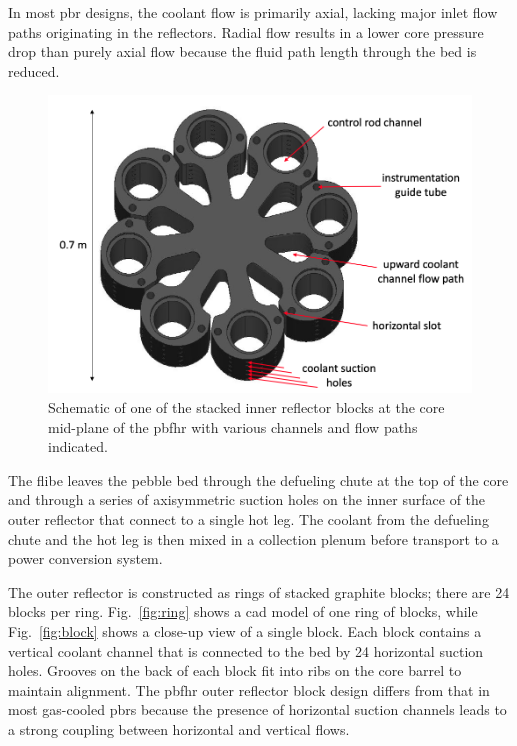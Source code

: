 In most \gls{pbr} designs, the coolant flow is primarily axial, lacking major inlet flow paths originating in the reflectors. Radial flow results in a lower core pressure drop than purely axial flow because the fluid path length through the bed is reduced. 

\begin{figure}[h!]
\centering
\hspace{1.1cm}
\includegraphics[width=0.5\linewidth]{figs/center_reflector_labeled.png}
\caption{Schematic of one of the stacked inner reflector blocks at the core mid-plane of the \gls{pbfhr} with various channels and flow paths indicated.}
\label{fig:in}
\end{figure}

The \gls{flibe} leaves the pebble bed through the defueling chute at the top of the core and through a series of axisymmetric suction holes on the inner surface of the outer reflector that connect to a single hot leg. The coolant from the defueling chute and the hot leg is then mixed in a collection plenum before transport to a power conversion system.

The outer reflector is constructed as rings of stacked graphite blocks; there are 24 blocks per ring. Fig.\ \ref{fig:ring} shows a \gls{cad} model of one ring of blocks, while Fig.\ \ref{fig:block} shows a close-up view of a single block. Each block contains a vertical coolant channel that is connected to the bed by 24 horizontal suction holes. Grooves on the back of each block fit into ribs on the core barrel to maintain alignment. The \gls{pbfhr} outer reflector block design differs from that in most gas-cooled \glspl{pbr} because the presence of horizontal suction channels leads to a strong coupling between horizontal and vertical flows.

